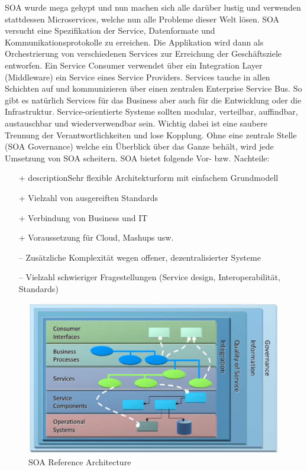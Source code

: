 SOA wurde mega gehypt und nun machen sich alle darüber lustig und verwenden stattdessen Microservices, welche nun alle Probleme dieser Welt lösen. SOA versucht eine Spezifikation der Service, Datenformate und Kommunikationsprotokolle zu erreichen. Die Applikation wird dann als Orchestrierung von verschiedenen Services zur Erreichung der Geschäftsziele entworfen. Ein Service Consumer verwendet über ein Integration Layer (Middleware) ein Service eines Service Providers. Services tauche in allen Schichten auf und kommunizieren über einen zentralen Enterprise Service Bus. So gibt es natürlich Services für das Business aber auch für die Entwicklung oder die Infrastruktur. Service-orientierte Systeme sollten modular, verteilbar, auffindbar, austauschbar und wiederverwendbar sein. Wichtig dabei ist eine saubere Trennung der Verantwortlichkeiten und lose Kopplung. Ohne eine zentrale Stelle (SOA Governance) welche ein Überblick über das Ganze behält, wird jede Umsetzung von SOA scheitern. SOA bietet folgende Vor- bzw. Nachteile:
\begin{itemize}
	\item[+] descriptionSehr flexible Architekturform mit einfachem Grundmodell
	\item[+] Vielzahl von ausgereiften Standards
	\item[+] Verbindung von Business und IT
	\item[+] Voraussetzung für Cloud, Mashups usw.
	\item[--] Zusätzliche Komplexität wegen offener, dezentralisierter Systeme	
	\item[--] Vielzahl schwieriger Fragestellungen (Service design, Interoperabilität, Standards)
\end{itemize}

\begin{figure}[h!]
\centering
\includegraphics[width=0.7\linewidth]{fig/soa-reference-architecture}
\caption{SOA Reference Architecture}
\label{fig:soa-reference-architecture}
\end{figure}


